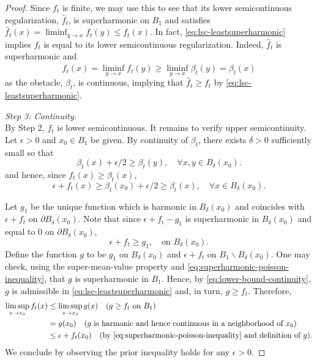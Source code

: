\documentclass[12pt]{amsart}
\numberwithin{equation}{section}
\begin{document}
\begin{proof}
		Since $f_t$ is finite, we may use this to see that its lower semicontinuous regularization, $\hat{f}_t$, is superharmonic on $B_1$ and satisfies $\hat{f}_t(x) = \liminf_{y \to x} f_t(y) \leq f_t(x)$.
		In fact, \eqref{eq:lsc-leastsuperharmonic} implies $f_t$ is equal to its lower semicontinuous regularization. Indeed, $\hat{f}_t$ is superharmonic and 
		\[
		\hat{f}_t(x) = \liminf_{y \to x} f_t(y) \geq \liminf_{ y \to x} \beta_t(y) =  \beta_t(x)
		\]
		as the obstacle, $\beta_t$, is continuous, implying that $\hat{f}_t \geq f_t$ by \eqref{eq:lsc-leastsuperharmonic}.
		
		{\it Step 3: Continuity.} \\
		By Step 2, $f_t$ is lower semicontinuous. It remains to verify upper semicontinuity. 
		Let $\epsilon > 0$ and $x_0 \in B_1$ be given. By continuity of $\beta_t$, there exists $\delta > 0$ sufficiently small so that
		\[
		\beta_t(x) +\epsilon/2 \geq \beta_t(y), \quad \forall x,y \in B_{\delta}(x_0).
		\]
		and hence, since $f_t(x) \geq \beta_t(x)$,
		\begin{equation} \label{eq:lower-bound-continuity}
		\epsilon + f_t(x) \geq \beta_t(x_0) + \epsilon/2 \geq \beta_t(x), \quad \forall x \in B_{\delta}(x_0).
		\end{equation}
		
		Let $g_1$ be the unique function which is harmonic in $B_{\delta}(x_0)$ and coincides with $\epsilon + f_t$ on $\partial B_{\delta}(x_0)$. 
		Note that since $\epsilon + f_t - g_1$ is superharmonic in $B_{\delta}(x_0)$ and equal to 0 on $\partial B_{\delta}(x_0)$, 
		\begin{equation} \label{eq:superharmonic-poisson-inequality}
		\epsilon + f_t \geq g_1, \quad \mbox{on $B_{\delta}(x_0)$}.
		\end{equation}
		Define the function $g$ to be $g_1$ on $B_{\delta}(x_0)$ and $\epsilon + f_t$ on $B_1 \backslash B_{\delta}(x_0)$.
		One may check, using the super-mean-value property and \eqref{eq:superharmonic-poisson-inequality}, that $g$ is superharmonic in $B_1$. Hence, by \eqref{eq:lower-bound-continuity}, $g$ is admissible in \eqref{eq:lsc-leastsuperharmonic} and, in turn, $g \geq f_t$.
		Therefore, 
		\begin{align*}
		\limsup_{x \to x_0} f_t(x) &\leq \limsup_{x \to x_0} g(x) \quad \mbox{($g \geq f_t$ on $B_1$)} \\
		&= g(x_0)\quad \mbox{($g$ is harmonic and hence continuous in a neighborhood of $x_0$)} \\
		&\leq \epsilon + f_t(x_0) \quad \mbox{(by \eqref{eq:superharmonic-poisson-inequality} and definition of $g$)}.
		\end{align*}
		We conclude by observing the prior inequality holds for any $\epsilon > 0$.
	\end{proof}
	
\end{document}
